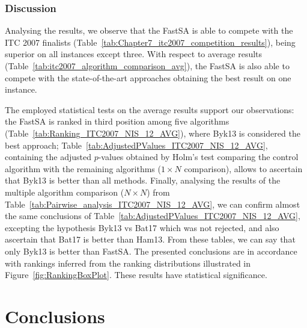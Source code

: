 



\subsubsection{Discussion}

Analysing the results, we observe that the FastSA is able to compete with the ITC 2007 finalists (Table~\ref{tab:Chapter7_itc2007_competition_results}), being superior on all instances except three. With respect to average results (Table~\ref{tab:itc2007_algorithm_comparison_avg}), the FastSA is also able to compete with the state-of-the-art approaches obtaining the best result on one instance.

The employed statistical tests on the average results support our observations: the FastSA is ranked in third position among five algorithms (Table~\ref{tab:Ranking_ITC2007_NIS_12_AVG}), where Byk13 is considered the best approach; Table~\ref{tab:AdjustedPValues_ITC2007_NIS_12_AVG}, containing the adjusted $p$-values obtained by Holm's test comparing the control algorithm with the remaining algorithms ($1 \times N$ comparison), allows to ascertain that Byk13 is better than all methods. Finally, analysing the results of the multiple algorithm comparison ($N \times N$) from Table~\ref{tab:Pairwise_analysis_ITC2007_NIS_12_AVG}, we can confirm almost the same conclusions of Table~\ref{tab:AdjustedPValues_ITC2007_NIS_12_AVG}, excepting the hypothesis Byk13 vs Bat17 which was not rejected, and also ascertain that Bat17 is better than Ham13. From these tables, we can say that only Byk13 is better than FastSA. The presented conclusions are in accordance with rankings inferred from the ranking distributions illustrated in Figure~\ref{fig:RankingBoxPlot}. These results have statistical significance.



\section{Conclusions}
\label{sec:Conclusions}


